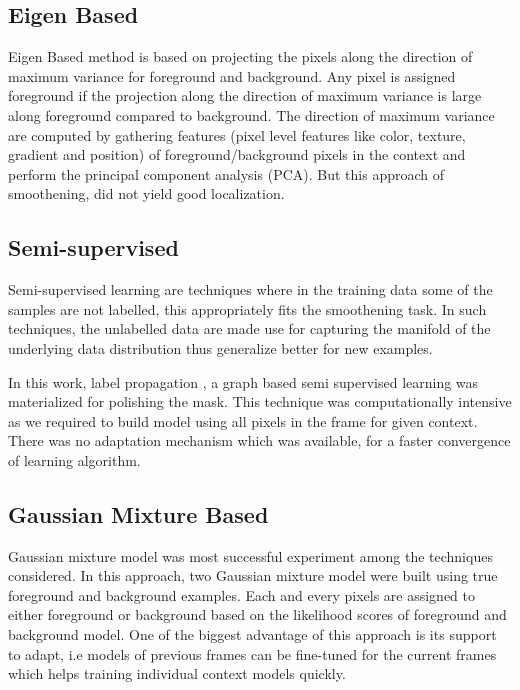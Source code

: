 \subsection{Eigen Based}
Eigen Based method is based on projecting the pixels along the direction of maximum variance for foreground and background.  Any pixel is assigned foreground if the projection along the direction of maximum variance is large along foreground compared to background.  The direction of maximum variance are computed by gathering features (pixel level features like color, texture, gradient and position) of foreground/background pixels in the context and perform the principal component analysis (PCA).  But this approach of smoothening, did not yield good localization.

\subsection{Semi-supervised}
Semi-supervised learning are techniques where in the training data some of the samples are not labelled, this appropriately fits the smoothening task.  In such techniques, the unlabelled data are made use for capturing the manifold of the underlying data distribution thus generalize better for new examples. 
\par In this work, label propagation \citep{labprop}, a graph based semi supervised learning was materialized for polishing the mask.  This technique was computationally intensive as we required to build model using all pixels in the frame for given context.  There was no adaptation mechanism which was available, for a faster convergence of learning algorithm.

\subsection{Gaussian Mixture Based}
Gaussian mixture model was  most successful experiment among the techniques considered.  In this approach, two Gaussian mixture model were built using true foreground and background examples. Each and every pixels are assigned to either foreground or background based on the likelihood scores of foreground and background model.  One of the biggest advantage of this approach is its support to adapt, i.e models of previous frames can be fine-tuned for the current frames which helps training individual context models quickly.

